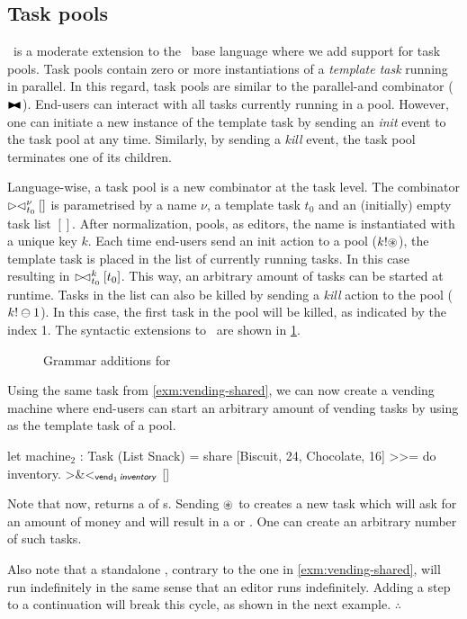 \subsection{Task pools}

\DYNTOPHAT\ is a moderate extension to the \TOPHAT\ base language where we add support for task pools.
Task pools contain zero or more instantiations of a \emph{template task} running in parallel.
In this regard, task pools are similar to the parallel-and combinator ($\blacktriangleright\mkern-8mu\blacktriangleleft$).
End-users can interact with all tasks currently running in a pool.
However, one can initiate a new instance of the template task by sending an \emph{init} event to the task pool at any time.
Similarly, by sending a \emph{kill} event, the task pool terminates one of its children.

Language-wise, a task pool is a new combinator at the task level.
The combinator $\rhd\mkern-5mu\lhd^\nu_{t_0} []$ is parametrised by a name $\nu$, a template task $t_0$ and an (initially) empty task list $[]$.
After normalization, pools, as editors, the name is instantiated with a unique key $k$.
Each time end-users send an init action to a pool ($k!\circledast$), the template task is placed in the list of currently running tasks.
In this case resulting in $\rhd\mkern-8mu\lhd^k_{t_0} [t_0]$.
This way, an arbitrary amount of tasks can be started at runtime.
Tasks in the list can also be killed by sending a \emph{kill} action to the pool ($k!\ominus1$).
In this case, the first task in the pool will be killed, as indicated by the index 1.
The syntactic extensions to \TOPHAT\ are shown in \cref{fig:dynamic-grammar}.

\begin{figure}
  \GDynamicextensions
  \caption{Grammar additions for \DYNTOPHAT}
  \label{fig:dynamic-grammar}
\end{figure}

\begin{example}
  \label{exm:vending-dynamic}
  Using the same  task from \cref{exm:vending-shared},
  we can now create a vending machine where end-users can start an arbitrary amount of vending tasks
  by using  as the template task of a pool.
  \begin{TASK}[emph={inventory}]
    let machine$_2$ : Task (List Snack) =
      share [{Biscuit, 24}, {Chocolate, 16}] >>= do inventory.
      >&<$_{\textsf{vend}_1\,\textsf{\textit{inventory}}}$ []
  \end{TASK}
  Note that now,  returns a  of s.
  Sending $\circledast$ to  creates a new  task
  which will ask for an amount of money and will result in a  or .
  One can create an arbitrary number of such tasks.

  Also note that a standalone , contrary to the one in \cref{exm:vending-shared}, will run indefinitely
  in the same sense that an editor runs indefinitely.
  Adding a step to a continuation will break this cycle,
  as shown in the next example.
\hfill$\therefore$\end{example}

